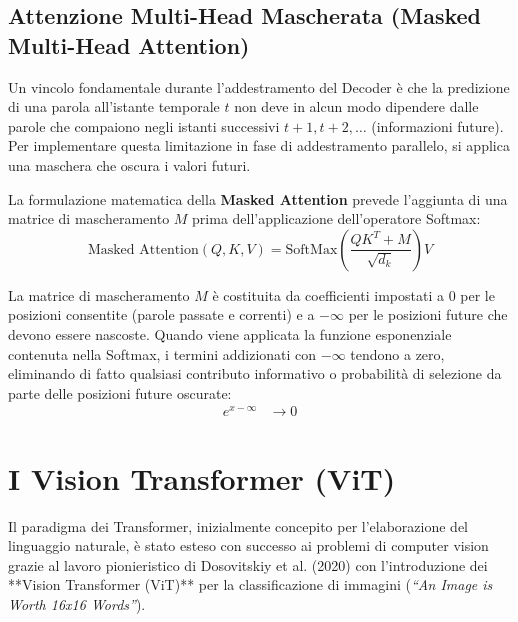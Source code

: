 ﻿\documentclass[11pt, a4paper]{article}
\begin{document}
\subsection{Attenzione Multi-Head Mascherata (Masked Multi-Head Attention)}

Un vincolo fondamentale durante l'addestramento del Decoder è che la predizione di una parola all'istante temporale $t$ non deve in alcun modo dipendere dalle parole che compaiono negli istanti successivi $t+1, t+2, \dots$ (informazioni future). Per implementare questa limitazione in fase di addestramento parallelo, si applica una maschera che oscura i valori futuri.


La formulazione matematica della \textbf{Masked Attention} prevede l'aggiunta di una matrice di mascheramento $M$ prima dell'applicazione dell'operatore Softmax:
\[
\boxed{\text{Masked Attention}(Q, K, V) = \text{SoftMax}\left(\frac{Q K^T + M}{\sqrt{d_k}}\right)V}
\]

La matrice di mascheramento $M$ è costituita da coefficienti impostati a $0$ per le posizioni consentite (parole passate e correnti) e a $-\infty$ per le posizioni future che devono essere nascoste. Quando viene applicata la funzione esponenziale contenuta nella Softmax, i termini addizionati con $-\infty$ tendono a zero, eliminando di fatto qualsiasi contributo informativo o probabilità di selezione da parte delle posizioni future oscurate:
\begin{align*}
e^{x - \infty} &\to 0
\end{align*}

\newpage

\section{I Vision Transformer (ViT)}

Il paradigma dei Transformer, inizialmente concepito per l'elaborazione del linguaggio naturale, è stato esteso con successo ai problemi di computer vision grazie al lavoro pionieristico di Dosovitskiy et al. (2020) con l'introduzione dei **Vision Transformer (ViT)** per la classificazione di immagini (\emph{``An Image is Worth 16x16 Words''}).

\end{document}
